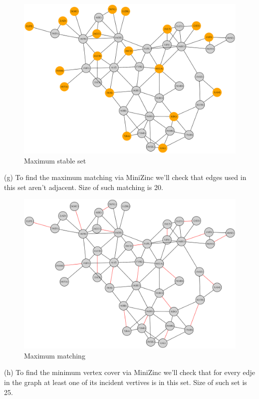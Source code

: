 \documentclass{article}
\begin{document}
	\begin{figure}[h]
		\centering
		\includegraphics[width=1\textwidth]{stable set.png}
		\caption{Maximum stable set}
	\end{figure}\newpage
	(g) To find the maximum matching via MiniZinc we'll check that edges used in this set aren't adjacent. Size of such matching is 20.
	\begin{figure}[h]
		\centering
		\includegraphics[width=1\textwidth]{matching.png}
		\caption{Maximum matching}
	\end{figure}\newpage
	(h) To find the minimum vertex cover via MiniZinc we'll check that for every edje in the graph at least one of its incident vertives is in this set. Size of such set is 25.
\end{document}
